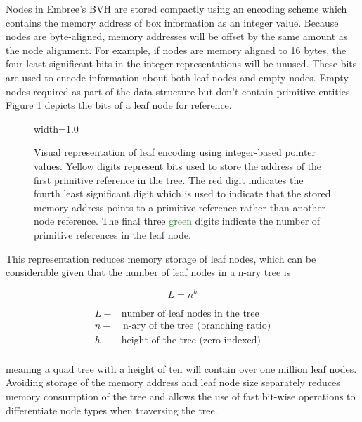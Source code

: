 Nodes in Embree's BVH are stored compactly using an encoding scheme which contains
the memory address of box information as an integer value. Because nodes are
byte-aligned, memory addresses will be offset by the same amount as the node
alignment. For example, if nodes are memory aligned to 16 bytes, the four least
significant bits in the integer representations will be unused. These bits are
used to encode information about both leaf nodes and empty nodes. Empty nodes
required as part of the data structure but don't contain primitive entities. Figure
\ref{fig:node_encoding} depicts the bits of a leaf node for reference.

\begin{figure}[H]
  \centering
  {width=1.0\textwidth}
  \caption[Graphic of leaf node encoding.]{Visual representation of leaf
    encoding using integer-based pointer values. \textcolor{Dandelion}{Yellow}
    digits represent bits used to store the address of the first primitive
    reference in the tree. The \textcolor{BrickRed}{red} digit indicates the fourth least significant
    digit which is used to indicate that the stored memory address points to a
    primitive reference rather than another node reference. The final three
    \textcolor{ForestGreen}{green} digits indicate the number of primitive references in the leaf node.}
  \label{fig:node_encoding}
\end{figure}

This representation reduces memory storage of leaf nodes, which can be
considerable given that the number of leaf nodes in a n-ary tree is

\begin{equation}
 L = n^{h}
\end{equation}

\begin{align*}
   L - & \textrm{number of leaf nodes in the tree} \\
   n - & \, \textrm{n-ary  of  the  tree  (branching  ratio)} \\
   h - &  \textrm{height  of  the  tree  (zero-indexed)} \\
\end{align*}

meaning a quad tree with a height of ten will contain over one million leaf
nodes. Avoiding storage of the memory address and leaf node size separately
reduces memory consumption of the tree and allows the use of fast bit-wise
operations to differentiate node types when traversing the tree.

